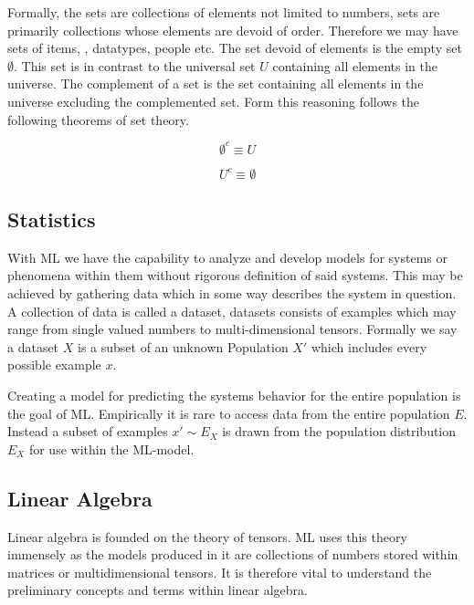 Formally, the sets are collections of elements not limited to numbers, sets are primarily collections whose elements are devoid of order. Therefore we may have sets of items, , datatypes, people etc. The set devoid of elements is the empty set $\emptyset$. This set is in contrast to the universal set $U$ containing all elements in the universe. The complement of a set is the set containing all elements in the universe excluding the complemented set. Form this reasoning follows the following theorems of set theory.

\begin{equation}
\label{eqn:emptyC}
\emptyset^c  \equiv U
\end{equation}

\begin{equation}
\label{eqnuniverseC}
U^c  \equiv \emptyset
\end{equation}



\subsection{Statistics}

With ML we have the capability to analyze and develop models for systems or phenomena within them without rigorous definition of said systems. This may be achieved by gathering data which in some way describes the system in question. A collection of data is called a dataset, datasets consists of examples which may range from single valued numbers to multi-dimensional tensors. Formally we say a dataset $X$ is a subset of an unknown Population $X'$ which includes every possible example $x$.


Creating a model for predicting the systems behavior for the entire population is the goal of ML. Empirically it is rare to access data from the entire population $E$. Instead a subset of examples $x' \sim E_{X}$ is drawn from the population distribution $E_{X}$ for use within the ML-model. 

\subsection{Linear Algebra}

Linear algebra is founded on the theory of tensors. ML uses this theory immensely as the models produced in it are collections of numbers stored within matrices or multidimensional tensors. It is therefore vital to understand the preliminary concepts and terms within linear algebra.

